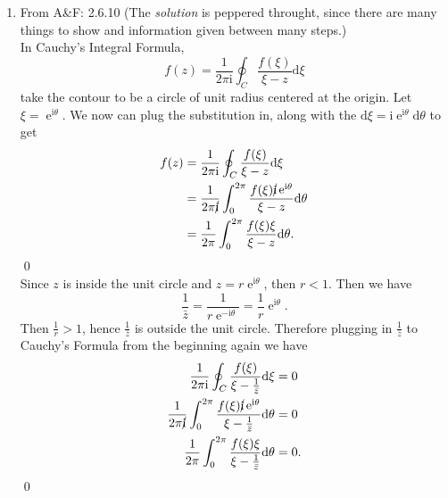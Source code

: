 \documentclass[10pt]{amsart}
\newcommand{\D}{\mathrm{d}}
\newcommand{\I}{\mathrm{i}}
\DeclareMathOperator{\E}{e}
\theoremstyle{nonumberplain}
\begin{document}
\begin{enumerate}[label={\bf {\arabic*}:}]
\item From A\&F: 2.6.10
(The \textit{solution} is peppered throught, since there are many things to show and information given between many steps.)\\
In Cauchy's Integral Formula,
$$
f(z) = \frac 1 {2\pi \I} \oint_C \frac{f(\xi)}{\xi - z} \D \xi
$$
take the contour to be a circle of unit radius centered at the origin.
Let $\xi = \E^{\I\theta}$.
We now can plug the substitution in, along with the $\D \xi = \I \E^{\I \theta} \D \theta$ to get
\begin{align*}
f(z) &= \frac 1 {2\pi \I} \oint_C \frac{f(\xi)}{\xi - z} \D \xi \\
	&= \frac 1 {2\pi \cancel{\I}} \int_0^{2\pi} \frac{f(\xi) \cancel{\I} \E^{\I \theta}}{\xi - z} \D \theta \\
	&= \frac 1 {2\pi} \int_0^{2\pi} \frac{f(\xi)\xi}{\xi - z} \D \theta.
\end{align*}
\qed \\
Since $z$ is inside the unit circle and $z=r\E^{\I \theta}$, then $r < 1$.
Then we have
$$ \frac 1 {\bar z} =  \frac 1 {r \E^{-\I \theta}} = \frac 1 r { \E^{\I \theta}}.$$
Then $\frac 1 r  > 1$, hence $\frac 1 {\bar z}$ is outside the unit circle.
Therefore plugging in $\frac 1 {\bar z}$ to Cauchy's Formula from the beginning again we have
\begin{align*}
\frac 1 {2\pi \I} \oint_C \frac{f(\xi)}{\xi - \frac 1 {\bar z}} \D \xi &= 0 \\
\frac 1 {2\pi \cancel{\I}} \int_0^{2\pi} \frac{f(\xi) \cancel{\I} \E^{\I \theta}}{\xi - \frac 1 {\bar z}} \D \theta &= 0 \\
\frac 1 {2\pi} \int_0^{2\pi} \frac{f(\xi)\xi}{\xi - \frac 1 {\bar z}} \D \theta &= 0.
\end{align*}
\qed \\


\end{enumerate}
\end{document}
